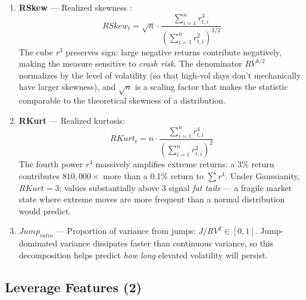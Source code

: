 \documentclass[11pt,a4paper]{article}
\begin{document}
\begin{enumerate}
    \item \textbf{RSkew} --- Realized skewness \citep{amaya2015}:
    \begin{equation}
        RSkew_t = \sqrt{n} \cdot \frac{\sum_{i=1}^{n} r_{t,i}^3}{\left(\sum_{i=1}^{n} r_{t,i}^2\right)^{3/2}}
    \end{equation}
    The cube $r^3$ preserves sign: large negative returns contribute negatively, making the measure sensitive to \textit{crash risk}. The denominator $RV^{3/2}$ normalizes by the level of volatility (so that high-vol days don't mechanically have larger skewness), and $\sqrt{n}$ is a scaling factor that makes the statistic comparable to the theoretical skewness of a distribution.

    \item \textbf{RKurt} --- Realized kurtosis:
    \begin{equation}
        RKurt_t = n \cdot \frac{\sum_{i=1}^{n} r_{t,i}^4}{\left(\sum_{i=1}^{n} r_{t,i}^2\right)^{2}}
    \end{equation}
    The fourth power $r^4$ massively amplifies extreme returns: a 3\% return contributes $810{,}000\times$ more than a 0.1\% return to $\sum r^4$. Under Gaussianity, $RKurt = 3$; values substantially above 3 signal \textit{fat tails} --- a fragile market state where extreme moves are more frequent than a normal distribution would predict.

    \item \textbf{$Jump_{ratio}$} --- Proportion of variance from jumps: $J / RV^2 \in [0,1]$. Jump-dominated variance dissipates faster than continuous variance, so this decomposition helps predict \textit{how long} elevated volatility will persist.
\end{enumerate}

\subsection{Leverage Features (2)}
\end{document}
